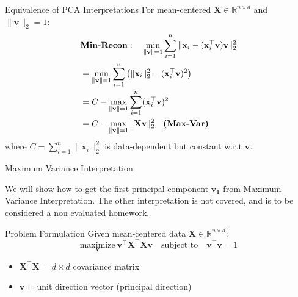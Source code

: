 \documentclass{beamer}
\begin{document}
\begin{frame}{Equivalence of PCA Interpretations}
        For mean-centered $\mathbf{X} \in \mathbb{R}^{n \times d}$ and $\|\mathbf{v}\|_2 = 1$:
        \begin{align*}
            &\text{\textbf{Min-Recon}}: \quad \min_{\|\mathbf{v}\|=1} \sum_{i=1}^n \|\mathbf{x}_i - (\mathbf{x}_i^\top \mathbf{v})\mathbf{v}\|_2^2 \\
            &= \min_{\|\mathbf{v}\|=1} \sum_{i=1}^n \left( \|\mathbf{x}_i\|_2^2 - (\mathbf{x}_i^\top \mathbf{v})^2 \right) \\
            &= C - \max_{\|\mathbf{v}\|=1} \sum_{i=1}^n (\mathbf{x}_i^\top \mathbf{v})^2 \\
            &= C - \max_{\|\mathbf{v}\|=1} \|\mathbf{X}\mathbf{v}\|_2^2 \quad \text{\textbf{(Max-Var)}} 
        \end{align*}
        where $C = \sum_{i=1}^n \|\mathbf{x}_i\|_2^2$ is data-dependent but constant w.r.t $\mathbf{v}$.

\end{frame}


\begin{frame}{Maximum Variance Interpretation}

We will show how to get the first principal component $\mathbf{v_1}$ from Maximum Variance Interpretation. The other interpretation is not covered, and is to be considered a non evaluated homework.

\vspace{0.3cm}

    \begin{block}{Problem Formulation}
        Given mean-centered data $\mathbf{X} \in \mathbb{R}^{n \times d}$:
        \vspace{-0.2cm}
        \[
        \underset{\mathbf{v}}{\text{maximize}}\ \mathbf{v}^\top \mathbf{X}^\top \mathbf{X} \mathbf{v} \quad \text{subject to}\quad \mathbf{v}^\top \mathbf{v} = 1
        \]
        \begin{itemize}
            \item $\mathbf{X}^\top \mathbf{X}$ = $d \times d$ covariance matrix
            \item $\mathbf{v}$ = unit direction vector (principal direction)
        \end{itemize}
    \end{block}
\end{frame}
\end{document}
